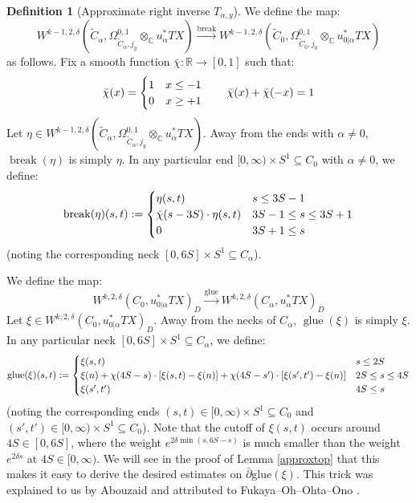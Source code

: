 \documentclass[12pt]{article}
\theoremstyle{definition}
\newtheorem{definition}[theorem]{Definition}
\theoremstyle{remark}
\numberwithin{equation}{subsection}
\newcommand{\CC}{\mathbb C}
\newcommand{\RR}{\mathbb R}
\newcommand{\delbar}{\bar\partial}
\begin{document}
\begin{definition}[Approximate right inverse $T_{\alpha,y}$]
We define the map:
\begin{equation}
W^{k-1,2,\delta}(\tilde C_\alpha,\Omega^{0,1}_{\tilde C_\alpha,j_y}\otimes_\CC u_\alpha^\ast TX)\xrightarrow{\mathrm{break}}W^{k-1,2,\delta}(\tilde C_0,\Omega^{0,1}_{\tilde C_0,j_0}\otimes_\CC u_{0|\alpha}^\ast TX)
\end{equation}
as follows.  Fix a smooth function $\bar\chi:\RR\to[0,1]$ such that:
\begin{equation}
\bar\chi(x)=\begin{cases}1&x\leq-1\cr0&x\geq+1\end{cases}\qquad\bar\chi(x)+\bar\chi(-x)=1
\end{equation}
Let $\eta\in W^{k-1,2,\delta}(\tilde C_\alpha,\Omega^{0,1}_{\tilde C_\alpha,j_y}\otimes_\CC u_\alpha^\ast TX)$.  Away from the ends with $\alpha\ne 0$, $\operatorname{break}(\eta)$ is simply $\eta$.  In any particular end $[0,\infty)\times S^1\subseteq C_0$ with $\alpha\ne 0$, we define:
\begin{equation}
\operatorname{break}(\eta)(s,t):=\begin{cases}
\eta(s,t)&s\leq 3S-1\cr
\bar\chi(s-3S)\cdot\eta(s,t)&3S-1\leq s\leq 3S+1\cr
0&3S+1\leq s
\end{cases}
\end{equation}
(noting the corresponding neck $[0,6S]\times S^1\subseteq C_\alpha$).

We define the map:
\begin{equation}
W^{k,2,\delta}(C_0,u_{0|\alpha}^\ast TX)_D\xrightarrow{\mathrm{glue}}W^{k,2,\delta}(C_\alpha,u_\alpha^\ast TX)_D
\end{equation}
Let $\xi\in W^{k,2,\delta}(C_0,u_{0|\alpha}^\ast TX)_D$.  Away from the necks of $C_\alpha$, $\operatorname{glue}(\xi)$ is simply $\xi$.  In any particular neck $[0,6S]\times S^1\subseteq C_\alpha$, we define:
\begin{equation}
\operatorname{glue}(\xi)(s,t):=\begin{cases}
\xi(s,t)&s\leq 2S\cr
\xi(n)+\chi(4S-s)\cdot[\xi(s,t)-\xi(n)]+\chi(4S-s')\cdot[\xi(s',t')-\xi(n)]&2S\leq s\leq 4S\cr
\xi(s',t')&4S\leq s
\end{cases}
\end{equation}
(noting the corresponding ends $(s,t)\in[0,\infty)\times S^1\subseteq C_0$ and $(s',t')\in[0,\infty)\times S^1\subseteq C_0$).  Note that the cutoff of $\xi(s,t)$ occurs around $4S\in[0,6S]$, where the weight $e^{2\delta\min(s,6S-s)}$ is much smaller than the weight $e^{2\delta s}$ at $4S\in[0,\infty)$.  We will see in the proof of Lemma \ref{approxtop} that this makes it easy to derive the desired estimates on $\delbar\mathrm{glue}(\xi)$.  This trick was explained to us by Abouzaid and attributed to Fukaya--Oh--Ohta--Ono \cite{foootechnicaldetails}.
\end{definition}
\end{document}
